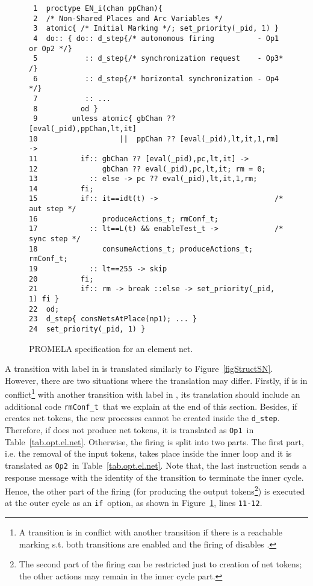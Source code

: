 \documentclass{llncs}
\begin{document}
\mfont
\begin{figure}[t!]
\begin{verbatim}
 1  proctype EN_i(chan ppChan){
 2  /* Non-Shared Places and Arc Variables */
 3  atomic{ /* Initial Marking */; set_priority(_pid, 1) }
 4  do:: { do:: d_step{/* autonomous firing          - Op1 or Op2 */}
 5           :: d_step{/* synchronization request    - Op3* /}
 6           :: d_step{/* horizontal synchronization - Op4 */}
 7           :: ...
 8          od }
 9        unless atomic{ gbChan ?? [eval(_pid),ppChan,lt,it]
10                   ||  ppChan ?? [eval(_pid),lt,it,1,rm]       ->
11          if:: gbChan ?? [eval(_pid),pc,lt,it] ->
12               gbChan ?? eval(_pid),pc,lt,it; rm = 0;
13            :: else -> pc ?? eval(_pid),lt,it,1,rm;
14          fi;
15          if:: it==idt(t) ->                           /* aut step */
16               produceActions_t; rmConf_t;
17            :: lt==L(t) && enableTest_t ->             /* sync step */
18               consumeActions_t; produceActions_t; rmConf_t;
19            :: lt==255 -> skip
20          fi;
21          if:: rm -> break ::else -> set_priority(_pid, 1) fi }
22  od;
23  d_step{ consNetsAtPlace(np1); ... }
24  set_priority(_pid, 1) }
\end{verbatim}
\vspace{-5pt}
\caption{PROMELA specification for an element net.}
\label{figStructNetEl}
\end{figure}
\nfont


A transition  with label in   is translated similarly to Figure~\ref{figStructSN}. However, there are two situations where the translation may differ. Firstly, if  is in conflict\footnote{ A transition  is in conflict with another transition  if there is a reachable marking  s.t. both transitions are enabled and the firing of  disables .} with another transition with label in , its translation should include an additional code \small\verb"rmConf_t"\nfont\ that we explain at the end of this section. Besides, if  creates net tokens, the new processes cannot be created inside the \small\verb"d_step"\nfont. Therefore, if  does not produce net tokens, it is translated as \small\verb"Op1"\nfont\  in Table~\ref{tab.opt.el.net}. Otherwise, the firing is split into two parts. The first part, i.e. the removal of the input tokens, takes place inside the inner loop and it is translated as \small\verb"Op2"\nfont\   in Table~\ref{tab.opt.el.net}. Note that, the last instruction sends a response message  with the identity of the transition to terminate the inner cycle. Hence, the other part of the firing (for producing the output tokens\footnote{The second part of the firing can be restricted just to creation of net tokens; the other actions may remain in the inner cycle part.}) is executed at the outer cycle as an \small\verb"if"\nfont\ option, as shown in Figure~\ref{figStructNetEl}, lines \small\verb"11-12"\nfont.
\end{document}
